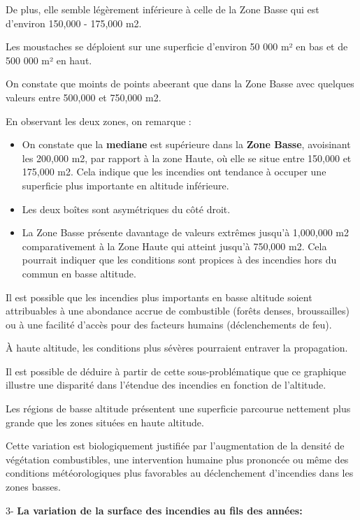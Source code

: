 \documentclass[
]{article}
\begin{document}
De plus, elle semble légèrement inférieure à celle de la Zone Basse qui
est d'environ 150,000 - 175,000 m2.

Les moustaches se déploient sur une superficie d'environ 50 000 m² en
bas et de 500 000 m² en haut.

On constate que moints de points abeerant que dans la Zone Basse avec
quelques valeurs entre 500,000 et 750,000 m2.

En observant les deux zones, on remarque :

\begin{itemize}
\item
  On constate que la \textbf{mediane} est supérieure dans la
  \textbf{Zone Basse}, avoisinant les 200,000 m2, par rapport à la zone
  Haute, où elle se situe entre 150,000 et 175,000 m2. Cela indique que
  les incendies ont tendance à occuper une superficie plus importante en
  altitude inférieure.
\item
  Les deux boîtes sont asymétriques du côté droit.
\item
  La Zone Basse présente davantage de valeurs extrêmes jusqu'à 1,000,000
  m2 comparativement à la Zone Haute qui atteint jusqu'à 750,000 m2.
  Cela pourrait indiquer que les conditions sont propices à des
  incendies hors du commun en basse altitude.
\end{itemize}

Il est possible que les incendies plus importants en basse altitude
soient attribuables à une abondance accrue de combustible (forêts
denses, broussailles) ou à une facilité d'accès pour des facteurs
humains (déclenchements de feu).

À haute altitude, les conditions plus sévères pourraient entraver la
propagation.

Il est possible de déduire à partir de cette sous-problématique que ce
graphique illustre une disparité dans l'étendue des incendies en
fonction de l'altitude.

Les régions de basse altitude présentent une superficie parcourue
nettement plus grande que les zones situées en haute altitude.

Cette variation est biologiquement justifiée par l'augmentation de la
densité de végétation combustibles, une intervention humaine plus
prononcée ou même des conditions météorologiques plus favorables au
déclenchement d'incendies dans les zones basses.

3- \textbf{La variation de la surface des incendies au fils des années:}
\end{document}

